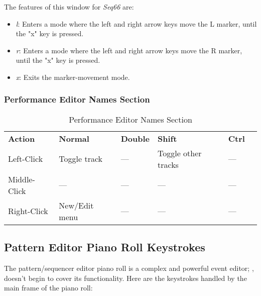    The features of this window for \textsl{Seq66} are:

   \begin{itemize}
      \item \textsl{l}:  Enters a mode where the left and right arrow keys move
         the L marker, until the "x" key is pressed.
      \item \textsl{r}:  Enters a mode where the left and right arrow keys move
         the R marker, until the "x" key is pressed.
      \item \textsl{x}:  Exits the marker-movement  mode.
   \end{itemize}

\subsubsection{Performance Editor Names Section}
\label{subsubsec:kbd_mouse_performance_editor_names_section}

   \begin{table}[H]
      \centering
      \caption{Performance Editor Names Section}
      \label{table:performance_editor_names}
      \begin{tabular}{l l l l l l}
         \textbf{Action}   & \textbf{Normal}    & \textbf{Double}    & \textbf{Shift}        & \textbf{Ctrl}   \\
         Left-Click        & Toggle track       & ---                & Toggle other tracks   & ---             \\
         Middle-Click      & ---                & ---                & ---                   & ---             \\
         Right-Click       & New/Edit menu      & ---                & ---                   & ---             \\
      \end{tabular}
   \end{table}

\subsection{Pattern Editor Piano Roll Keystrokes}
\label{subsec:kbd_mouse_pattern_editor_piano_roll_keystrokes}

   The pattern/sequencer editor piano roll is a complex and powerful event
   editor;
   ,
   doesn't begin to cover its functionality.
   Here are the keystrokes handled by the main frame of the piano roll:

